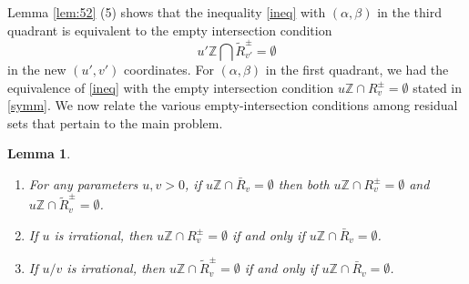 \documentclass[12pt,letterpaper, reqno]{amsart}
\newtheorem{lem}[thm]{Lemma}
\theoremstyle{definition}
\theoremstyle{remark}
\newcommand{\ZZ}{\ensuremath{\mathbb{Z}}}
\newcommand{\uu}{{u'}}
\newcommand{\vv}{{v'}}
\newcommand{\R}{{R}}
\newcommand{\floor}[1]{\lfloor{#1}\rfloor}
\newcommand{\ceil}[1]{\lceil{#1}\rceil}
\begin{document}
Lemma \ref{lem:52} (5) shows that the inequality \eqref{ineq} with $(\alpha,\beta)$ in the third quadrant is equivalent to the empty intersection condition
\begin{equation}\label{intermediate}
{\uu} \ZZ \bigcap  \widetilde{\R}_\vv^{\pm}= \emptyset
\end{equation}
in the new $(\uu,\vv)$ coordinates.
For $(\alpha,\beta)$ in the first quadrant, we had the equivalence of \eqref{ineq} with the empty intersection condition $u\ZZ\cap R^\pm_v = \emptyset$ stated in \eqref{symm}.
We now relate the various empty-intersection conditions among residual sets that pertain to the main problem.

\begin{lem}\label{empty-intersections}
\begin{enumerate}
\item For any parameters $u,v>0$, if
$ u\ZZ\cap\bar{R}_v =\emptyset$ then both $ u\ZZ\cap R_v^\pm=\emptyset$
and 
$u\ZZ\cap  \widetilde{R}_{v}^\pm=\emptyset $.
\item If $u$ is irrational, then 
$ u\ZZ\cap R_v^\pm=\emptyset $ if and only if $ u\ZZ\cap\bar{R}_v = \emptyset$.
\item If $u/v$ is irrational, then
$ u\ZZ\cap \widetilde{R}_{v}^\pm =\emptyset $ if and only if $ u\ZZ\cap \bar{R}_v = \emptyset$.
\end{enumerate}
\end{lem}
\end{document}
